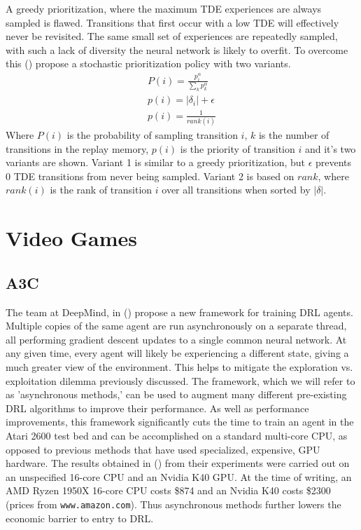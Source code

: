 A greedy prioritization, where the maximum TDE experiences are always sampled is flawed. Transitions that first occur with a low TDE will effectively never be revisited. The same small set of experiences are repeatedly sampled, with such a lack of diversity the neural network is likely to overfit. To overcome this (\citet{prioritized}) propose a stochastic prioritization policy with two variants.
\begin{gather}
    \label{equ:prob_exp}
    P(i) = \frac{p_i^\alpha}{\sum_kp_k^\alpha} \\
    \label{equ:priority1}
    p(i) = |\delta_i| + \epsilon \\
    \label{equ:priority2}
    p(i) = \frac{1}{rank(i)}
\end{gather}
Where $P(i)$ is the probability of sampling transition $i$, $k$ is the number of transitions in the replay memory, $p(i)$ is the priority of transition $i$ and it's two variants are shown. Variant 1 is similar to a greedy prioritization, but $\epsilon$ prevents 0 TDE transitions from never being sampled. Variant 2 is based on $rank$, where $rank(i)$ is the rank of transition $i$ over all transitions when sorted by $|\delta|$.

\section{Video Games}

\subsection{A3C}
The team at DeepMind, in (\citet{a3c}) propose a new framework for training DRL agents. Multiple copies of the same agent are run asynchronously on a separate thread, all performing gradient descent updates to a single common neural network. At any given time, every agent will likely be experiencing a different state, giving a much greater view of the environment. This helps to mitigate the exploration vs. exploitation dilemma previously discussed. The framework, which we will refer to as 'asynchronous methods,' can be used to augment many different pre-existing DRL algorithms to improve their performance. As well as performance improvements, this framework significantly cuts the time to train an agent in the Atari 2600 test bed and can be accomplished on a standard multi-core CPU, as opposed to previous methods that have used specialized, expensive, GPU hardware. The results obtained in (\citet{a3c}) from their experiments were carried out on an unspecified 16-core CPU and an Nvidia K40 GPU. At the time of writing, an AMD Ryzen 1950X 16-core CPU costs \$874 and an Nvidia K40 costs \$2300 (prices from \texttt{www.amazon.com}). Thus asynchronous methods further lowers the economic barrier to entry to DRL. \paragraph{}

